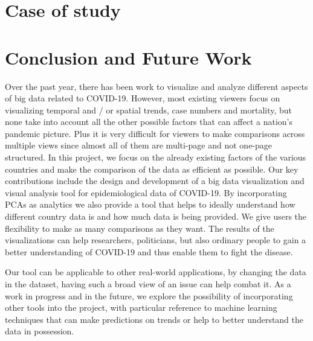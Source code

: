 \documentclass[10pt,conference]{IEEEtran}
\begin{document}
\section{Case of study}

\section{Conclusion and Future Work}
Over the past year, there has been work to visualize and analyze different aspects of big data related to COVID-19. However, most existing viewers focus on visualizing temporal and / or spatial trends, case numbers and mortality, but none take into account all the other possible factors that can affect a nation's pandemic picture. Plus it is very difficult for viewers to make comparisons across multiple views since almost all of them are multi-page and not one-page structured. In this project, we focus on the already existing factors of the various countries and make the comparison of the data as efficient as possible. Our key contributions include the design and development of a big data visualization and visual analysis tool for epidemiological data of COVID-19. By incorporating PCAs as analytics we also provide a tool that helps to ideally understand how different country data is and how much data is being provided. We give users the flexibility to make as many comparisons as they want. The results of the visualizations can help researchers, politicians, but also ordinary people to gain a better understanding of COVID-19 and thus enable them to fight the disease.

Our tool can be applicable to other real-world applications, by changing the data in the dataset, having such a broad view of an issue can help combat it. As a work in progress and in the future, we explore the possibility of incorporating other tools into the project, with particular reference to machine learning techniques that can make predictions on trends or help to better understand the data in possession.
\end{document}
